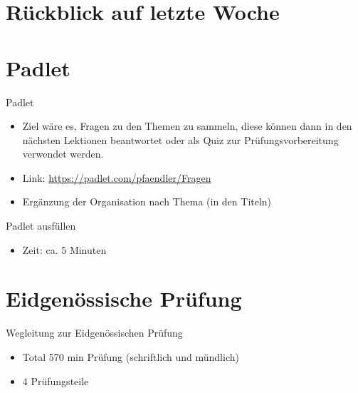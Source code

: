 \section{Rückblick auf letzte Woche}
\BlueSectionSlide


\section{Padlet}
\begin{frame}{Padlet}
    \begin{itemize}
        \item[\textbullet] Ziel wäre es, Fragen zu den Themen zu sammeln, diese können dann in den nächsten Lektionen beantwortet oder als Quiz zur Prüfungsvorbereitung verwendet werden.
        \item[\textbullet] Link: \url{https://padlet.com/pfaendler/Fragen}
        \item[\textbullet] Ergänzung der Organisation nach Thema (in den Titeln)
    \end{itemize}
\end{frame}


\begin{frame}{Padlet ausfüllen}

    \begin{itemize}
        \item[\textbullet] Zeit: ca. 5 Minuten
    \end{itemize}

\end{frame}







\section{Eidgenössische Prüfung}
\BlueSectionSlide
\begin{frame}{Wegleitung zur Eidgenössischen Prüfung}
    \begin{itemize}
        \item[\textbullet] Total 570 min Prüfung (schriftlich und mündlich)
        \item[\textbullet] 4 Prüfungsteile
    \end{itemize}
\end{frame}

